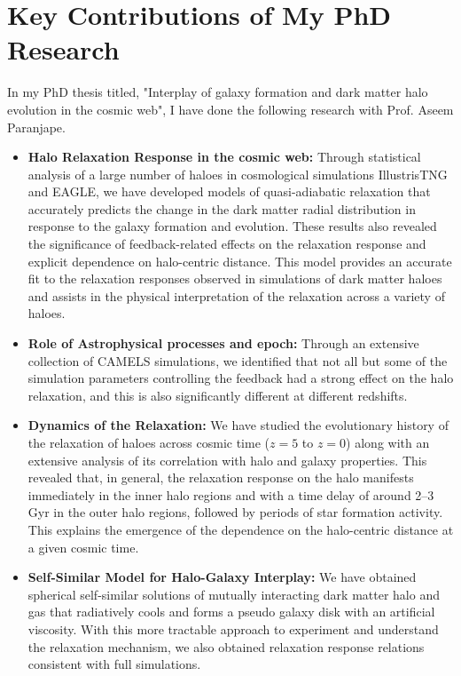 \documentclass[11pt]{article}
\begin{document}
\section{Key Contributions of My PhD Research}

In my PhD thesis titled, "Interplay of galaxy formation and dark matter halo evolution in the cosmic web", I have done the following research with Prof. Aseem Paranjape.

\begin{itemize}
    \item \textbf{Halo Relaxation Response in the cosmic web:} Through statistical analysis of a large number of haloes in cosmological simulations IllustrisTNG and EAGLE, we have developed models of quasi-adiabatic relaxation that accurately predicts the change in the dark matter radial distribution in response to the galaxy formation and evolution. These results also revealed the significance of feedback-related effects on the relaxation response and explicit dependence on halo-centric distance. This model provides an accurate fit to the relaxation responses observed in simulations of dark matter haloes and assists in the physical interpretation of the relaxation across a variety of haloes.
    
    \item \textbf{Role of Astrophysical processes and epoch:} Through an extensive collection of CAMELS simulations, we identified that not all but some of the simulation parameters controlling the feedback had a strong effect on the halo relaxation, and this is also significantly different at different redshifts.
    
    \item \textbf{Dynamics of the Relaxation:}  We have studied the evolutionary history of the relaxation of haloes across cosmic time ($z=5$ to $z=0$) along with an extensive analysis of its correlation with halo and galaxy properties. This revealed that, in general, the relaxation response on the halo manifests immediately in the inner halo regions and with a time delay of around 2–3 Gyr in the outer halo regions, followed by periods of star formation activity. This explains the emergence of the dependence on the halo-centric distance at a given cosmic time.
    
    \item \textbf{Self-Similar Model for Halo-Galaxy Interplay:} We have obtained spherical self-similar solutions of mutually interacting dark matter halo and gas that radiatively cools and forms a pseudo galaxy disk with an artificial viscosity. With this more tractable approach to experiment and understand the relaxation mechanism, we also obtained relaxation response relations consistent with full simulations.
\end{itemize}
\end{document}
